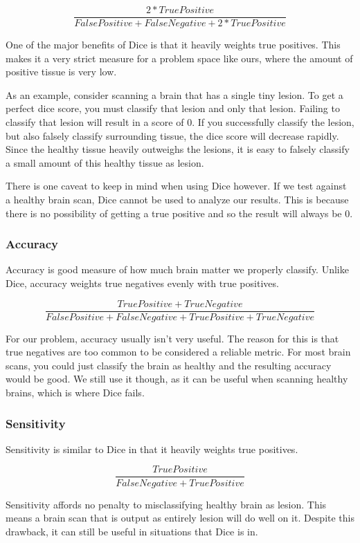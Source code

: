 \documentclass{article} %
\begin{document}
$$\frac{2*True Positive}{False Positive + False Negative + 2*True Positive}$$

One of the major benefits of Dice is that it heavily weights true positives. This makes it a very strict measure for a problem space like ours, where the amount of positive tissue is very low. 

As an example, consider scanning a brain that has a single tiny lesion. To get a perfect dice score, you must classify that lesion and only that lesion. Failing to classify that lesion will result in a score of 0. If you successfully classify the lesion, but also falsely classify surrounding tissue, the dice score will decrease rapidly. Since the healthy tissue heavily outweighs the lesions, it is easy to falsely classify a small amount of this healthy tissue as lesion.

There is one caveat to keep in mind when using Dice however. If we test against a healthy brain scan, Dice cannot be used to analyze our results. This is because there is no possibility of getting a true positive and so the result will always be 0.

\subsubsection{Accuracy}
Accuracy is good measure of how much brain matter we properly classify. Unlike Dice, accuracy weights true negatives evenly with true positives.

$$\frac{True Positive + True Negative}{False Positive + False Negative + True Positive + True Negative}$$

For our problem, accuracy usually isn't very useful. The reason for this is that true negatives are too common to be considered a reliable metric. For most brain scans, you could just classify the brain as healthy and the resulting accuracy would be good. We still use it though, as it can be useful when scanning healthy brains, which is where Dice fails.

\subsubsection{Sensitivity}

Sensitivity is similar to Dice in that it heavily weights true positives.

$$\frac{True Positive}{False Negative + True Positive}$$

Sensitivity affords no penalty to misclassifying healthy brain as lesion. This means a brain scan that is output as entirely lesion will do well on it. Despite this drawback, it can still be useful in situations that Dice is in.
\end{document}
